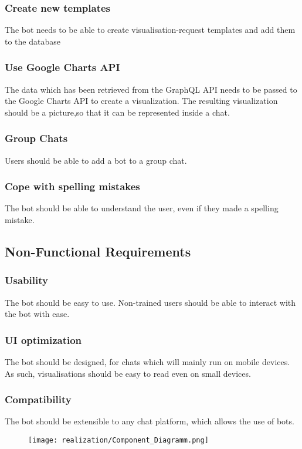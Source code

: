 \subsubsection{Create new templates} The bot needs to be able to create visualisation-request templates and add them to the database

\subsubsection{Use Google Charts API} The data which has been retrieved from the GraphQL API needs to be passed to the Google Charts API to create a visualization. The resulting visualization should be a picture,so that it can be represented inside a chat.

\subsubsection{Group Chats} Users should be able to add a bot to a group chat.

\subsubsection{Cope with spelling mistakes} The bot should be able to understand the user, even if they made a spelling mistake.

\subsection{Non-Functional Requirements}

\subsubsection{Usability} The bot should be easy to use. Non-trained users should be able to interact with the bot with ease.

\subsubsection{UI optimization} The bot should be designed, for chats which will mainly run on mobile devices. As such, visualisations should be easy to read even on small devices.

\subsubsection{Compatibility} The bot should be extensible to any chat platform, which allows the use of bots.

\begin{figure}[h]
    \centering
    \texttt{[image: realization/Component\_Diagramm.png]}
\end{figure}